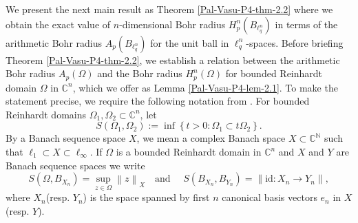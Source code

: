 \documentclass[a4paper,12pt]{amsart}
\theoremstyle{definition}
\newcommand{\norm}[1]{\left\lVert#1\right\rVert}
\begin{document}
We present the next main result as Theorem \ref{Pal-Vasu-P4-thm-2.2} where we obtain the exact value of $n$-dimensional Bohr radius $H^n_{p}(B_{\ell^n_{q}})$ in terms of the arithmetic Bohr radius $A_p(B_{\ell^n_{q}})$ for the unit ball in $\ell^n_{q}$-spaces. Before briefing Theorem \ref{Pal-Vasu-P4-thm-2.2}, we establish a relation between the arithmetic Bohr radius $A_p(\Omega)$ and the Bohr radius $H^n_{p}(\Omega)$ for bounded Reinhardt domain $\Omega$ in $\mathbb{C}^n$, which we offer as Lemma \ref{Pal-Vasu-P4-lem-2.1}. To make the statement precise, we require the following notation from \cite{defant-2004}. For  bounded Reinhardt domains $\Omega_{1}, \Omega_{2}\subset \mathbb{C}^n$, let
\begin{equation*}
	S(\Omega_1, \Omega_{2}):= \inf \left\{t>0 : \Omega_{1} \subset t\Omega_{2}\right\}.
\end{equation*}
 By a Banach sequence space $X$, we mean a complex Banach space $X\subset \mathbb{C}^{\mathbb{N}}$ such that $\ell_{1}\subset X \subset \ell_{\infty}$. If $\Omega$ is a bounded Reinhardt domain in $\mathbb{C}^n$ and $X$ and $Y$ are Banach sequence spaces we write
\begin{equation}\label{Pal-Vasu-P4-e-2.3}
	S(\Omega, B_{X_n})= \sup_{z\in \Omega}\norm{z}_{X} \quad \mbox{and }\quad  S(B_{X_n}, B_{Y_n})= \norm{\mbox{id}: X_n \rightarrow Y_n},
\end{equation}
where $X_n$(resp. $Y_n$) is the space spanned by first $n$ canonical basis vectors $e_n$ in $X$(resp. $Y$).
\end{document}
